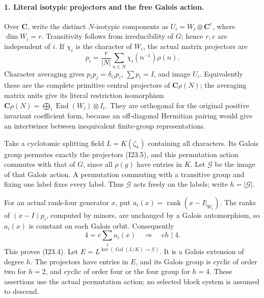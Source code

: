 \paragraph{1. Literal isotypic projectors and the free Galois action.}
Over \(\mathbf C\), write the distinct \(N\)-isotypic components
as \(U_i=W_i\otimes\mathbf C^e\), where \(\dim W_i=r\).
Transitivity follows from irreducibility of \(G\); hence \(r,e\)
are independent of \(i\). If \(\chi_i\) is the character of
\(W_i\), the actual matrix projectors are
\[
       p_i=\frac r{|N|}\sum_{n\in N}\chi_i(n^{-1})\rho(n).
                                                               \tag{I23.5}
\]
Character averaging gives \(p_ip_j=\delta_{ij}p_i\),
\(\sum p_i=I\), and image \(U_i\). Equivalently these are
the complete primitive central projectors of \(\mathbf C\rho(N)\);
the averaging matrix units give its literal restriction isomorphism
\(\mathbf C\rho(N)=\bigoplus_i\operatorname{End}(W_i)\otimes I_e\).
They are orthogonal for the original positive invariant coefficient
form, because an off-diagonal Hermitian pairing would give an
intertwiner between inequivalent finite-group representations.

Take a cyclotomic splitting field \(L=K(\zeta_a)\) containing all
characters. Its Galois group permutes exactly the projectors (I23.5),
and this permutation action commutes with that of \(G\), since all
\(\rho(g)\) have entries in \(K\). Let \(\mathcal G\) be the
image of that Galois action. A permutation commuting with a transitive
group and fixing one label fixes every label. Thus \(\mathcal G\)
acts freely on the labels; write \(h=|\mathcal G|\).

For an actual rank-four generator \(x\), put
\(a_i(x)=\operatorname{rank}(x-I|_{W_i})\). The ranks of
\((x-I)p_i\), computed by minors, are unchanged by a Galois
automorphism, so \(a_i(x)\) is constant on each Galois orbit.
Consequently
\[
                  4=e\sum_i a_i(x)\quad\Longrightarrow\quad eh\mid4.
                                                               \tag{I23.6}
\]
This proves (I23.4). Let \(E=L^{\ker(\operatorname{Gal}(L/K)
\to\mathcal G)}\). It is a Galois extension of degree \(h\).
The projectors have entries in \(E\), and its Galois group is
cyclic of order two for \(h=2\), and cyclic of order four or
the four group for \(h=4\). These assertions use the actual
permutation action; no selected block system is assumed to descend.

